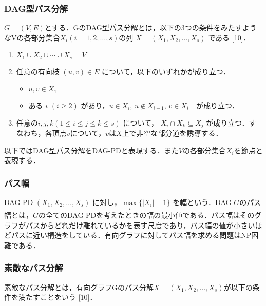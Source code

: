 \documentclass{kuisthesis}           %
\begin{document}
 \subsubsection{DAG型パス分解}
 $G=(V, E)$とする．GのDAG型パス分解とは，以下の3つの条件をみたすようなVの各部分集合$ X_i (i = 1, 2,  \ldots, s)$の列 $X=(X_1, X_2,  \ldots, X_s)$ である [10]．

 \begin{enumerate}
  \item $ X_1 \cup X_2 \cup \cdots \cup X_s = V $ 
  \item 任意の有向枝 $ (u, v) \in E $ について，以下のいずれかが成り立つ．
  \begin{itemize}
      \item $u, v \in X_1$
      \item ある $i$ $(i \geq 2)$ があり，$u \in X_i$, $u \notin X_{i-1}$, $v \in X_i$　が成り立つ．
  \end{itemize}
  \item 任意の$ i, j, k (1 \leq i \leq j \leq k \leq s)$ について， $X_i \cap X_k \subseteq X_j$ が成り立つ．すなわち，各頂点$v$について，$v$は$X$上で非空な部分道を誘導する．
\end{enumerate}

 以下ではDAG型パス分解をDAG-PDと表現する．また$V$の各部分集合$X_i$を節点と表現する．

 \subsubsection{パス幅}
 DAG-PD $(X_1, X_2,   \ldots, X_s)$ に対し，$ \underset{i}{\max} \{ |X_i|-1 \}$ を幅という．DAG $G$のパス幅とは，$G$の全てのDAG-PDを考えたときの幅の最小値である．パス幅はそのグラフがパスからどれだけ離れているかを表す尺度であり，パス幅の値が小さいほどパスに近い構造をしている．有向グラフに対してパス幅を求める問題はNP困難である．

 
 \subsubsection{素敵なパス分解}
 素敵なパス分解とは，有向グラフGのパス分解$X=(X_1, X_2,   \ldots, X_s)$が以下の条件を満たすことをいう [10]．
\end{document}
